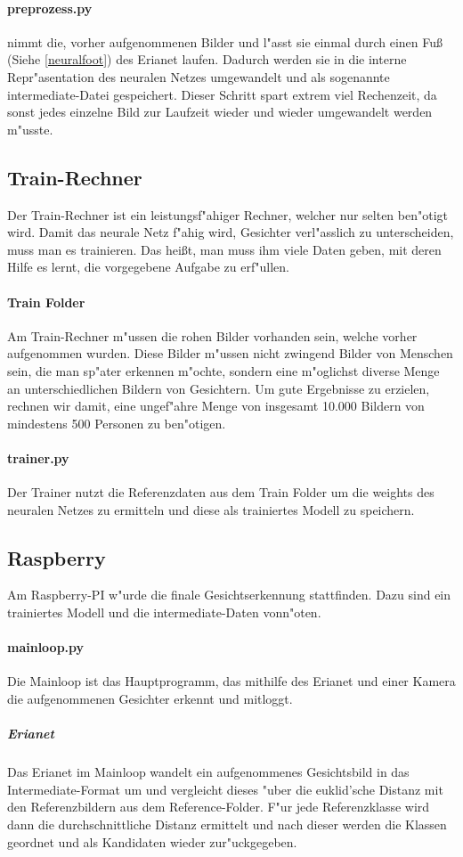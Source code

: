 \documentclass[12pt]{article}
\begin{document}
\paragraph{preprozess.py}
nimmt die, vorher aufgenommenen Bilder und l"asst sie einmal 
durch einen Fu{\ss} (Siehe \ref{neuralfoot}) des Erianet laufen. Dadurch
werden sie in die interne Repr"asentation des neuralen Netzes 
umgewandelt und als sogenannte intermediate-Datei gespeichert.
Dieser Schritt spart extrem viel Rechenzeit, da sonst
jedes einzelne Bild zur Laufzeit wieder und wieder 
umgewandelt werden m"usste.
\subsection{Train-Rechner}
Der Train-Rechner ist ein leistungsf"ahiger Rechner, welcher nur selten
ben"otigt wird. Damit das neurale Netz f"ahig wird, Gesichter verl"asslich
zu unterscheiden, muss man es trainieren. Das hei{\ss}t, man muss ihm viele
Daten geben, mit deren Hilfe es lernt, die vorgegebene Aufgabe zu erf"ullen.
\paragraph{Train Folder} Am Train-Rechner m"ussen die rohen
Bilder vorhanden sein, welche vorher aufgenommen wurden.
Diese Bilder m"ussen nicht zwingend Bilder von Menschen sein,
die man sp"ater erkennen m"ochte, sondern eine m"oglichst diverse
Menge an unterschiedlichen Bildern von Gesichtern. Um gute Ergebnisse
zu erzielen, rechnen wir damit, eine ungef"ahre Menge von insgesamt
10.000 Bildern von mindestens 500 Personen zu ben"otigen.
\paragraph{trainer.py}
Der Trainer nutzt die Referenzdaten aus dem Train Folder 
um die weights des neuralen Netzes zu ermitteln und diese
als trainiertes Modell zu speichern.
\subsection{Raspberry}
Am Raspberry-PI w"urde die finale Gesichtserkennung stattfinden.
Dazu sind ein trainiertes Modell und die intermediate-Daten vonn"oten.
\paragraph{mainloop.py}
Die Mainloop ist das Hauptprogramm, das mithilfe des Erianet und einer Kamera
die aufgenommenen Gesichter erkennt und mitloggt.
\subparagraph{Erianet}
Das Erianet im Mainloop wandelt ein aufgenommenes Gesichtsbild in
das Intermediate-Format um und vergleicht dieses "uber die 
euklid'sche Distanz mit den Referenzbildern aus dem Reference-Folder.
F"ur jede Referenzklasse wird dann die durchschnittliche Distanz
ermittelt und nach dieser werden die Klassen geordnet und als
Kandidaten wieder zur"uckgegeben.
\end{document}
